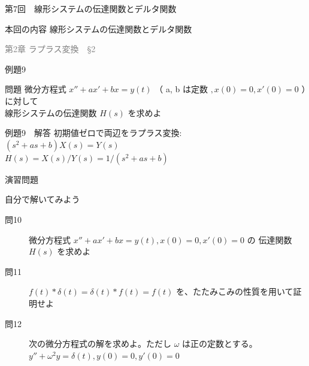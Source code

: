 \documentclass[professionalfonts]{beamer}
\begin{document}
\begin{frame}{第7回　線形システムの伝達関数とデルタ関数}
  \begin{block}{本回の内容}
  線形システムの伝達関数とデルタ関数
  \end{block}
  \vfill\hfill{\scriptsize \textcolor{gray}{第2章 ラプラス変換　§2}}
\end{frame}

\begin{frame}{例題9}
  \begin{exampleblock}{問題}
    微分方程式 $x'' + ax' + bx = y(t)$ （ a, b は定数 $, x(0)=0, x'(0)=0$ ）に対して\\[2pt]
    線形システムの伝達関数 $H(s)$ を求めよ\\[2pt]
  \end{exampleblock}
\end{frame}

\begin{frame}{例題9　解答}
  初期値ゼロで両辺をラプラス変換:\\[4pt]
  $(s^{2}+as+b)X(s) = Y(s)$\\[4pt]
  $H(s) = X(s)/Y(s) = 1/(s^{2}+as+b)$
\end{frame}

\begin{frame}{演習問題}
  \begin{exampleblock}{自分で解いてみよう}
  \begin{description}
    \item[問10] 微分方程式 $x'' + ax' + bx = y(t), x(0)=0, x'(0)=0$ の
    伝達関数 $H(s)$ を求めよ\\
    \item[問11] $f(t)*\delta(t) = \delta(t)*f(t) = f(t)$ を、たたみこみの性質を用いて証明せよ
    \item[問12] 次の微分方程式の解を求めよ。ただし $\omega$ は正の定数とする。
    $y'' + \omega^{2}y = \delta(t),  y(0) = 0,  y'(0) = 0$\\
  \end{description}
  \end{exampleblock}
\end{frame}
\end{document}
